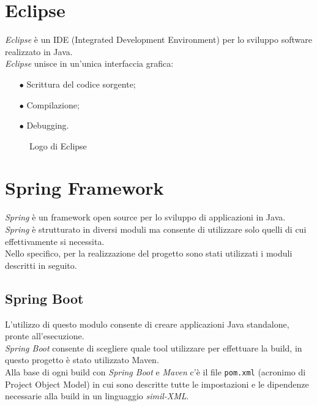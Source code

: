 \section{Eclipse}\label{sec:eclipse}
\emph{Eclipse} è un IDE (Integrated Development Environment) per lo sviluppo software realizzato in Java. \cite{Eclipse}\\
\emph{Eclipse} unisce in un'unica interfaccia grafica:
\begin{itemize}
	\item[$\bullet$]Scrittura del codice sorgente;
	\item[$\bullet$]Compilazione;
	\item[$\bullet$]Debugging.
\end{itemize}
\begin{figure}[ht]
	\centering
	\caption{Logo di Eclipse}
	\label{fig:one}
\end{figure}

\section{Spring Framework}\label{sec:spring}
\emph{Spring} è un framework open source per lo sviluppo di applicazioni in Java.\\
\emph{Spring} è strutturato in diversi moduli ma consente di utilizzare solo quelli di cui effettivamente si necessita. \cite{SpringFramework}\\
Nello specifico, per la realizzazione del progetto sono stati utilizzati i moduli descritti in seguito.
\subsection{Spring Boot}\label{sec:springboot}
L'utilizzo di questo modulo consente di creare applicazioni Java standalone, pronte all'esecuzione. \cite{springBoot}\\
\emph{Spring Boot} consente di scegliere quale tool utilizzare per effettuare la build, in questo progetto è stato utilizzato Maven.\\
Alla base di ogni build con \emph{Spring Boot} e \emph{Maven} c'è il file \texttt{pom.xml} (acronimo di Project Object Model) in cui sono descritte tutte le impostazioni e le dipendenze necessarie alla build in un linguaggio \emph{simil-XML}.
